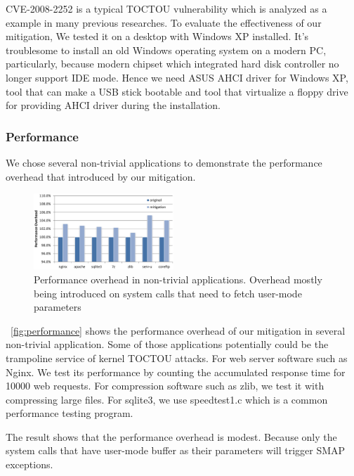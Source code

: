 CVE-2008-2252 is a typical TOCTOU vulnerability which is analyzed as a example in many previous researches. To evaluate the effectiveness of our mitigation, We tested it on a desktop with Windows XP installed. It's troublesome to install an old Windows operating system on a modern PC, particularly, because modern chipset which integrated hard disk controller no longer support IDE mode. Hence we need ASUS AHCI driver for Windows XP, tool that can make a USB stick bootable and tool that virtualize a floppy drive~\cite{installxpskylake} for providing AHCI driver during the installation.

\subsubsection{Performance}

We chose several non-trivial applications to demonstrate the performance overhead that introduced by our mitigation. 

\begin{figure}[th]
  \includegraphics[width=0.47\textwidth]{figures/performance}
  \centering
  \caption{Performance overhead in non-trivial applications. Overhead mostly being introduced on system calls that need to fetch user-mode parameters}
  \label{fig:performance}
\end{figure}

~\autoref{fig:performance} shows the performance overhead of our mitigation in several non-trivial application. Some of those applications potentially could be the trampoline service of kernel TOCTOU attacks.
For web server software such as Nginx. We test its performance by counting the accumulated response time for 10000 web requests. For compression software such as zlib, we test it with compressing large files. For sqlite3, we use speedtest1.c which is a common performance testing program.

The result shows that the performance overhead is modest. Because only the system calls that have user-mode buffer as their parameters will trigger SMAP exceptions. 


